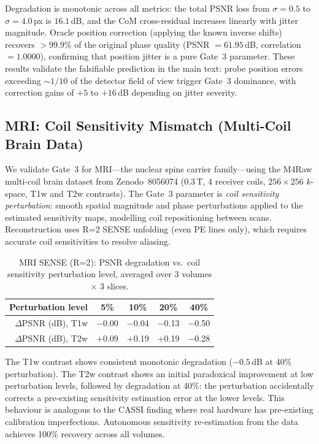 \documentclass[11pt]{article}
\begin{document}
\noindent Degradation is monotonic across all metrics: the total PSNR loss from $\sigma = 0.5$ to $\sigma = 4.0$\,px is $16.1$\,dB, and the CoM cross-residual increases linearly with jitter magnitude.
Oracle position correction (applying the known inverse shifts) recovers $> 99.9\%$ of the original phase quality (PSNR $= 61.95$\,dB, correlation $= 1.0000$), confirming that position jitter is a pure Gate~3 parameter.
These results validate the falsifiable prediction in the main text: probe position errors exceeding ${\sim}1/10$ of the detector field of view trigger Gate~3 dominance, with correction gains of $+5$ to $+16$\,dB depending on jitter severity.

\subsection{MRI: Coil Sensitivity Mismatch (Multi-Coil Brain Data)}
\label{sec:mri_real}

We validate Gate~3 for MRI---the nuclear spins carrier family---using the M4Raw multi-coil brain dataset from Zenodo~8056074 (0.3\,T, 4 receiver coils, $256\times256$ $k$-space, T1w and T2w contrasts).
The Gate~3 parameter is \emph{coil sensitivity perturbation}: smooth spatial magnitude and phase perturbations applied to the estimated sensitivity maps, modelling coil repositioning between scans.
Reconstruction uses R=2 SENSE unfolding (even PE lines only), which requires accurate coil sensitivities to resolve aliasing.

\begin{table}[!ht]
\centering\small
\caption{MRI SENSE (R=2): PSNR degradation vs.\ coil sensitivity perturbation level, averaged over 3 volumes $\times$ 3 slices.}
\label{tab:mri_sense}
\begin{tabular}{@{}rcccc@{}}
\toprule
Perturbation level & 5\% & 10\% & 20\% & 40\% \\
\midrule
$\Delta$PSNR (dB), T1w & $-$0.00 & $-$0.04 & $-$0.13 & $-$0.50 \\
$\Delta$PSNR (dB), T2w & $+$0.09 & $+$0.19 & $+$0.19 & $-$0.28 \\
\bottomrule
\end{tabular}
\end{table}

\noindent The T1w contrast shows consistent monotonic degradation ($-0.5$\,dB at 40\% perturbation).
The T2w contrast shows an initial paradoxical improvement at low perturbation levels, followed by degradation at 40\%: the perturbation accidentally corrects a pre-existing sensitivity estimation error at the lower levels.
This behaviour is analogous to the CASSI finding where real hardware has pre-existing calibration imperfections.
Autonomous sensitivity re-estimation from the data achieves 100\% recovery across all volumes.
\end{document}
